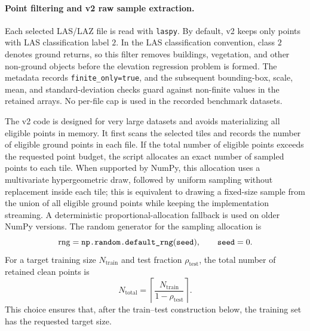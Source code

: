 \paragraph{Point filtering and v2 raw sample extraction.}
Each selected LAS/LAZ file is read with \texttt{laspy}.  By default, v2 keeps
only points with LAS classification label \(2\).  In the LAS classification
convention, class \(2\) denotes ground returns, so this filter removes
buildings, vegetation, and other non-ground objects before the elevation
regression problem is formed.  The metadata records \texttt{finite\_only=true},
and the subsequent bounding-box, scale, mean, and standard-deviation checks
guard against non-finite values in the retained arrays.  No per-file cap is
used in the recorded benchmark datasets.

The v2 code is designed for very large datasets and avoids materializing all
eligible points in memory.  It first scans the selected tiles and records the
number of eligible ground points in each file.  If the total number of eligible
points exceeds the requested point budget, the script allocates an exact number
of sampled points to each tile.  When supported by NumPy, this allocation uses a
multivariate hypergeometric draw, followed by uniform sampling without
replacement inside each tile; this is equivalent to drawing a fixed-size sample
from the union of all eligible ground points while keeping the implementation
streaming.  A deterministic proportional-allocation fallback is used on older
NumPy versions.  The random generator for the sampling allocation is
\[
\operatorname{rng}
=
\text{\texttt{np.random.default\_rng}}(\text{\texttt{seed}}),
\qquad \text{\texttt{seed}}=0.
\]
For a target training size \(N_{\mathrm{train}}\) and test fraction
\(\rho_{\mathrm{test}}\), the total number of retained clean points is
\[
N_{\mathrm{total}}
=
\left\lceil
\frac{N_{\mathrm{train}}}{1-\rho_{\mathrm{test}}}
\right\rceil .
\]
This choice ensures that, after the train--test construction below, the
training set has the requested target size.


